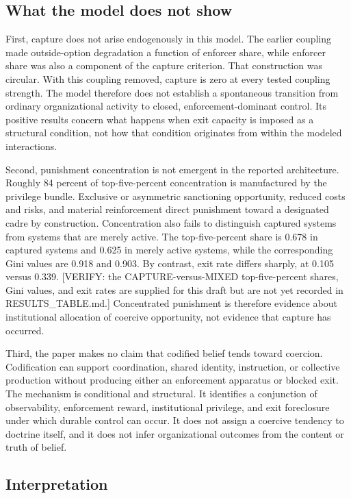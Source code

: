 \subsection{What the model does not show}

First, capture does not arise endogenously in this model. The earlier coupling made outside-option degradation a function of enforcer share, while enforcer share was also a component of the capture criterion. That construction was circular. With this coupling removed, capture is zero at every tested coupling strength. The model therefore does not establish a spontaneous transition from ordinary organizational activity to closed, enforcement-dominant control. Its positive results concern what happens when exit capacity is imposed as a structural condition, not how that condition originates from within the modeled interactions.

Second, punishment concentration is not emergent in the reported architecture. Roughly 84 percent of top-five-percent concentration is manufactured by the privilege bundle. Exclusive or asymmetric sanctioning opportunity, reduced costs and risks, and material reinforcement direct punishment toward a designated cadre by construction. Concentration also fails to distinguish captured systems from systems that are merely active. The top-five-percent share is 0.678 in captured systems and 0.625 in merely active systems, while the corresponding Gini values are 0.918 and 0.903. By contrast, exit rate differs sharply, at 0.105 versus 0.339. [VERIFY: the CAPTURE-versus-MIXED top-five-percent shares, Gini values, and exit rates are supplied for this draft but are not yet recorded in RESULTS_TABLE.md.] Concentrated punishment is therefore evidence about institutional allocation of coercive opportunity, not evidence that capture has occurred.

Third, the paper makes no claim that codified belief tends toward coercion. Codification can support coordination, shared identity, instruction, or collective production without producing either an enforcement apparatus or blocked exit. The mechanism is conditional and structural. It identifies a conjunction of observability, enforcement reward, institutional privilege, and exit foreclosure under which durable control can occur. It does not assign a coercive tendency to doctrine itself, and it does not infer organizational outcomes from the content or truth of belief.

\subsection{Interpretation}

